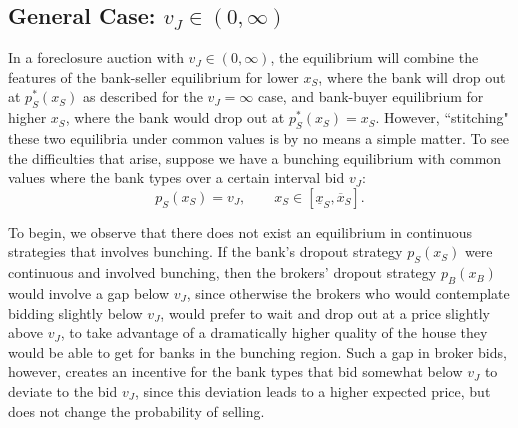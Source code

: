 \documentclass[11pt,twopage]{article}
\begin{document}

\subsection{General Case: $v_J \in (0,\infty)$}

In a foreclosure auction with $v_J\in (0,\infty)$, the equilibrium
will combine the features of the bank-seller equilibrium for lower
$x_S$, where the bank will drop out at $p_S^*(x_S)$ as described for
the $v_J=\infty$ case, and bank-buyer equilibrium for higher $x_S$,
where the bank would drop out at $p_S^*(x_S) = x_S$. However,
``stitching" these two equilibria under common values is by no means a
simple matter. To see the difficulties that arise, suppose we have a
bunching equilibrium with common values where the bank types over a
certain interval bid $v_J$:
\[ p_S(x_S) = v_J, \quad\quad x_S \in [\underline x_S,\overline x_S]
.\]

To begin, we observe that there does not exist an equilibrium in
continuous strategies that involves bunching.
If the bank's dropout strategy $p_S(x_S)$ were continuous and involved
bunching, then the brokers' dropout strategy $p_B(x_B)$ would involve
a gap below $v_J$, since otherwise the brokers who would contemplate
bidding slightly below $v_J$, would prefer to wait and drop out at a
price slightly above $v_J$, to take advantage of a dramatically higher
quality of the house they would be able to get for banks in the
bunching region. Such a gap in broker bids, however, creates an
incentive for the bank types that bid somewhat below $v_J$ to deviate
to the bid $v_J$, since this deviation leads to a higher expected
price, but does not change the probability of selling.
\end{document}
